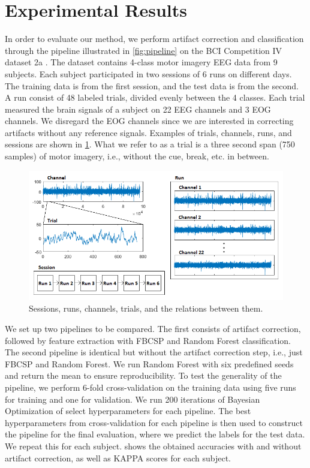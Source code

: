 \section{Experimental Results}\label{sec:results}
In order to evaluate our method, we perform artifact correction and classification through the pipeline illustrated in \cref{fig:pipeline} on the BCI Competition IV dataset 2a \citep{brunner2008bci}. The dataset contains 4-class motor imagery EEG data from 9 subjects. Each subject participated in two sessions of 6 runs on different days. The training data is from the first session, and the test data is from the second. A run consist of 48 labeled trials, divided evenly between the 4 classes. Each trial measured the brain signals of a subject on 22 EEG channels and 3 EOG channels. We disregard the EOG channels since we are interested in correcting artifacts without any reference signals. Examples of trials, channels, runs, and sessions are shown in \cref{fig:dataset}. What we refer to as a trial is a three second span (750 samples) of motor imagery, i.e., without the cue, break, etc. in between.

\begin{figure}
	\centering
	\begin{adjustbox}{width=\textwidth}
		\includegraphics{figures/bciiv2a.png}
	\end{adjustbox}
	\caption{Sessions, runs, channels, trials, and the relations between them.}
	\label{fig:dataset}
\end{figure}

We set up two pipelines to be compared. The first consists of artifact correction, followed by feature extraction with FBCSP and Random Forest classification. The second pipeline is identical but without the artifact correction step, i.e., just FBCSP and Random Forest. We run Random Forest with six predefined seeds and return the mean to ensure reproducibility.
To test the generality of the pipeline, we perform 6-fold cross-validation on the training data using five runs for training and one for validation. We run 200 iterations of Bayesian Optimization of select hyperparameters for each pipeline. The best hyperparameters from cross-validation for each pipeline is then used to construct the pipeline for the final evaluation, where we predict the labels for the test data. We repeat this for each subject. 
 shows the obtained accuracies with and without artifact correction, as well as KAPPA scores for each subject.

